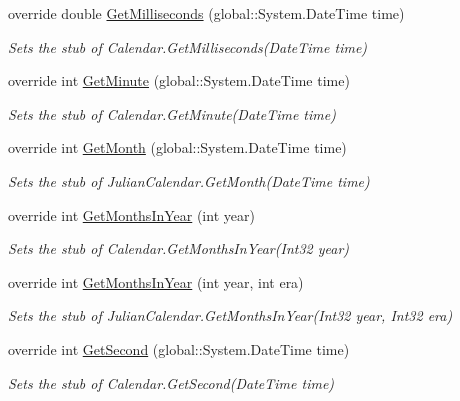 \begin{DoxyCompactItemize}
override double \hyperlink{class_system_1_1_globalization_1_1_fakes_1_1_stub_julian_calendar_aedf258db00544c1600191b434909964f}{Get\-Milliseconds} (global\-::\-System.\-Date\-Time time)
\begin{DoxyCompactList}\small\item\em Sets the stub of Calendar.\-Get\-Milliseconds(\-Date\-Time time)\end{DoxyCompactList}\item 
override int \hyperlink{class_system_1_1_globalization_1_1_fakes_1_1_stub_julian_calendar_a1c2628b776a333a22e071b937a42ceb2}{Get\-Minute} (global\-::\-System.\-Date\-Time time)
\begin{DoxyCompactList}\small\item\em Sets the stub of Calendar.\-Get\-Minute(\-Date\-Time time)\end{DoxyCompactList}\item 
override int \hyperlink{class_system_1_1_globalization_1_1_fakes_1_1_stub_julian_calendar_aa0b8a625bd72a15881fdc3d33f611a96}{Get\-Month} (global\-::\-System.\-Date\-Time time)
\begin{DoxyCompactList}\small\item\em Sets the stub of Julian\-Calendar.\-Get\-Month(\-Date\-Time time)\end{DoxyCompactList}\item 
override int \hyperlink{class_system_1_1_globalization_1_1_fakes_1_1_stub_julian_calendar_a4056245149c8321e1be29c5e7af6f3d6}{Get\-Months\-In\-Year} (int year)
\begin{DoxyCompactList}\small\item\em Sets the stub of Calendar.\-Get\-Months\-In\-Year(\-Int32 year)\end{DoxyCompactList}\item 
override int \hyperlink{class_system_1_1_globalization_1_1_fakes_1_1_stub_julian_calendar_ab9470944945204168615f3e2ea944bbd}{Get\-Months\-In\-Year} (int year, int era)
\begin{DoxyCompactList}\small\item\em Sets the stub of Julian\-Calendar.\-Get\-Months\-In\-Year(\-Int32 year, Int32 era)\end{DoxyCompactList}\item 
override int \hyperlink{class_system_1_1_globalization_1_1_fakes_1_1_stub_julian_calendar_a5e805e518b7062b536b3483a164d7dbf}{Get\-Second} (global\-::\-System.\-Date\-Time time)
\begin{DoxyCompactList}\small\item\em Sets the stub of Calendar.\-Get\-Second(\-Date\-Time time)\end{DoxyCompactList}\item 

\end{DoxyCompactItemize}
